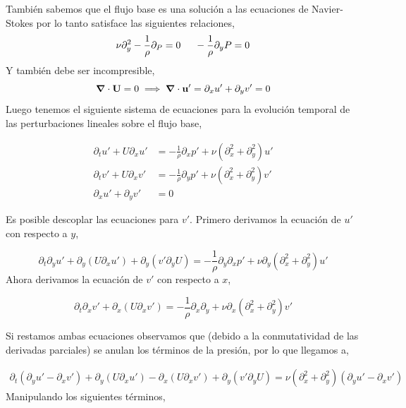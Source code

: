 \documentclass[executivepaper,12pt]{article}
\numberwithin{equation}{section}
\begin{document}
También sabemos que el flujo base es una solución a las ecuaciones de Navier-Stokes por lo tanto satisface las siguientes relaciones,
\begin{equation*}
	\nu\partial^2_y -\frac{1}{\rho} \partial_P =0 \hspace{0.5cm} -\frac{1}{\rho}\partial_yP=0
\end{equation*}
Y también debe ser incompresible,
\begin{equation*}
	\grad{}\cdot\vb{U}=0\implies \grad{}\cdot \vb{u}'=\partial_xu'+\partial_yv'=0
\end{equation*}
Luego tenemos el siguiente sistema de ecuaciones para la evolución temporal de las perturbaciones lineales sobre el flujo base,


\begin{align*}
	\partial_t u' +U\partial_x u' & =-\frac{1}{\rho} \partial_xp'+\nu(\partial_x^2 + \partial_y^2 )u' \\
		\partial_tv' + U\partial_x v'  &= -\frac{1}{\rho} \partial_yp'+\nu (\partial_x^2 +\partial_y^2)v'\\
	\partial_xu'+\partial_yv'&=0
\end{align*}

Es posible descoplar las ecuaciones para $v'$. Primero derivamos la ecuación de $u'$ con respecto a $y$,

\begin{equation*}
	\partial_t \partial_y u' +\partial_y (U\partial_xu')+\partial_y (v'\partial_y U)=-\frac{1}{\rho}\partial_y\partial_x p' +\nu \partial_y (\partial_x^2 +\partial_y^2)u'
\end{equation*}
Ahora derivamos la ecuación de $v'$ con respecto a $x$,

\begin{equation*}
	\partial_t \partial_xv' +\partial_x(U\partial_x v')=-\frac{1}{\rho}\partial_x\partial_y +\nu\partial_x(\partial_x^2 +\partial_y^2)v'
\end{equation*}

Si restamos ambas ecuaciones observamos que (debido a la conmutatividad de las derivadas parciales) se anulan los términos de la presión, por lo que llegamos a, 

\begin{align*}
	\partial_t(\partial_y u' -\partial_x v') +\partial_y(U\partial_x u')-\partial_x(U\partial_x v')+\partial_y(v'\partial_y U)=\nu(\partial_x^2 +\partial_y^2)(\partial_yu'-\partial_xv')
\end{align*}
Manipulando los siguientes términos,
\end{document}
